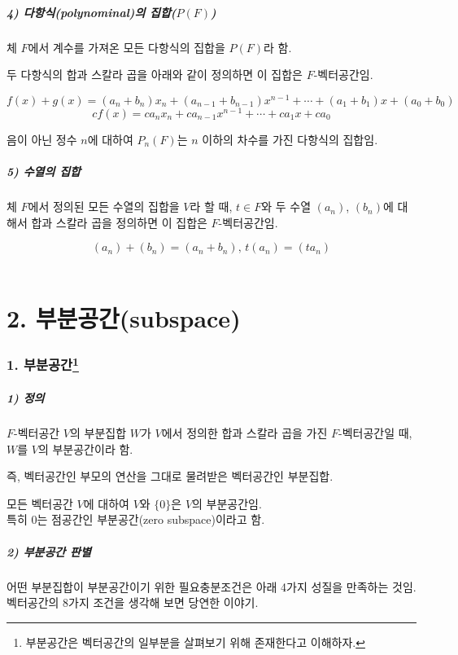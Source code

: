 \subsubsection*{4) 다항식(polynominal)의 집합($P(F)$)}
체 $F$에서 계수를 가져온 모든 다항식의 집합을 $P(F)$라 함.

두 다항식의 합과 스칼라 곱을 아래와 같이 정의하면 이 집합은 $F$-벡터공간임.

\[f(x)+g(x)=(a_n+b_n)x_n+(a_{n-1}+b_{n-1})x^{n-1}+ \cdots +(a_1+b_1)x+(a_0+b_0)\]
\[cf(x)=ca_nx_n+ca_{n-1}x^{n-1}+ \cdots +ca_1x+ca_0\]

음이 아닌 정수 $n$에 대하여 $P_n(F)$는 $n$ 이하의 차수를 가진 다항식의 집합임.


\subsubsection*{5) 수열의 집합}
체 $F$에서 정의된 모든 수열의 집합을 $V$라 할 때, $t \in F$와 두 수열 $(a_n)$, $(b_n)$에 대해서 합과 스칼라 곱을 정의하면 이 집합은 $F$-벡터공간임.

\[(a_n)+(b_n)=(a_n+b_n),\,t(a_n)=(ta_n)\]\\


\newpage


\part*{2. 부분공간(subspace)}

\section*{1. 부분공간\footnote{부분공간은 벡터공간의 일부분을 살펴보기 위해 존재한다고 이해하자.}}
\subsubsection*{1) 정의\\}
\begin{DEF}
$F$-벡터공간 $V$의 부분집합 $W$가 $V$에서 정의한 합과 스칼라 곱을 가진 $F$-벡터공간일 때, $W$를 $V$의 부분공간이라 함.
\end{DEF}

즉, 벡터공간인 부모의 연산을 그대로 물려받은 벡터공간인 부분집합.

모든 벡터공간 $V$에 대하여 $V$와 $\{ 0 \}$은 $V$의 부분공간임.\\
특히 ${0}$는 점공간인 부분공간(zero subspace)이라고 함.

\subsubsection*{2) 부분공간 판별}
어떤 부분집합이 부분공간이기 위한 필요충분조건은 아래 4가지 성질을 만족하는 것임.\\
벡터공간의 8가지 조건을 생각해 보면 당연한 이야기.

